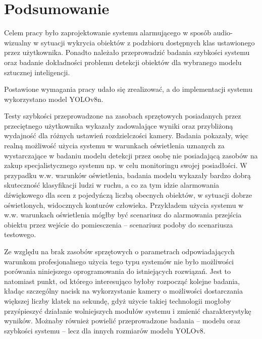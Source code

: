 \chapter{Podsumowanie}
\label{chap:podsumowanie}
Celem pracy było zaprojektowanie systemu alarmującego w sposób audio-wizualny w sytuacji wykrycia obiektów z podzbioru dostępnych klas ustawionego przez użytkownika. Ponadto należało przeprowadzić badania szybkości systemu oraz badanie dokładności problemu detekcji obiektów dla wybranego modelu sztucznej inteligencji.

Postawione wymagania pracy udało się zrealizować, a do implementacji systemu wykorzystano model YOLOv8n.

Testy szybkości przeprowadzone na zasobach sprzętowych posiadanych przez przeciętnego użytkownika wykazały zadowalające wyniki oraz przybliżoną wydajność dla różnych ustawień rozdzielczości kamery. Badania pokazały, więc realną możliwość użycia systemu w warunkach oświetlenia uznanych za wystarczające w badaniu modelu detekcji przez osobę nie posiadającą zasobów na zakup specjalistycznego systemu np. w celu monitoringu swojej posiadłości.
W przypadku w.w. warunków oświetlenia, badania modelu wykazały bardzo dobrą skuteczność klasyfikacji ludzi w ruchu, a co za tym idzie alarmowania dźwiękowego dla scen z pojedyńczą liczbą obecnych obiektów, w sytuacji dobrze oświetlonych, widocznych konturów człowieka. Przykładem użycia systemu w w.w. warunkach oświetlenia mógłby być scenariusz do alarmowania przejścia obiektu przez wejście do pomiesczenia -- scenariusz podoby do scenariusza testowego.  


Ze względu na brak zasobów sprzętowych o parametrach odpowiadających warunkom profesjonalnego użycia tego typu systemów nie było możliwości porówania niniejszego oprogramowania do istniejących rozwiązań. Jest to natomiast punkt, od którego interesująco byłoby rozpocząć kolejne badania, kładąc szczególny nacisk na wykorzystanie kamery o możliwości dostarczania większej liczby klatek na sekundę, gdyż użycie takiej technologii mogłoby przyśpieszyć działanie wolniejszych modułów systemu i zmienić charakterystykę wyników. Możnaby również powielić przeprowadzone badania -- modelu oraz szybkości systemu -- lecz dla innych rozmiarów modelu YOLOv8.  


